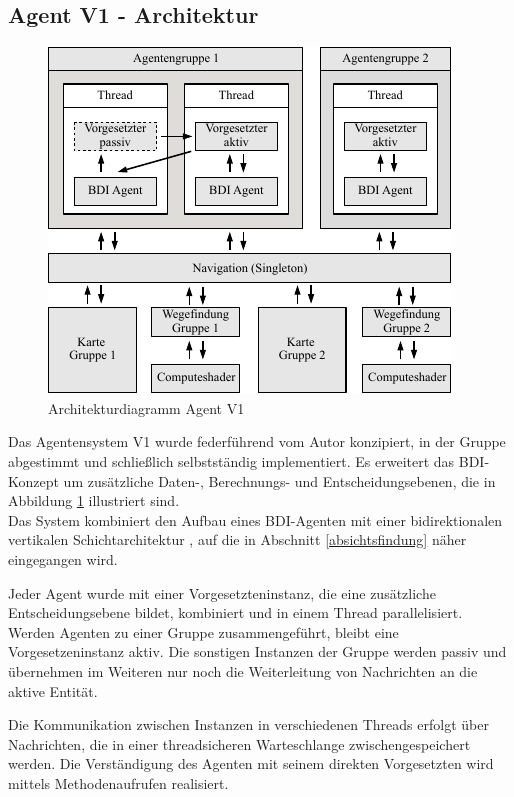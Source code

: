 \documentclass[runningheads]{llncs}
\begin{document}
\subsection{Agent V1 - Architektur}\label{agentV1}
\begin{figure}
\includegraphics{./Referenzen/Architekturdiagramm.pdf}
\caption{Architekturdiagramm Agent V1}
\label{g3:architecture}
\end{figure}
Das Agentensystem V1 wurde federführend vom Autor konzipiert, in der Gruppe abgestimmt und schließlich selbstständig implementiert. Es erweitert das BDI-Konzept \cite{Bratman1987} um zusätzliche Daten-, Berechnungs- und Entscheidungsebenen, die in Abbildung \ref{g3:architecture} illustriert sind. \\
Das System kombiniert den Aufbau eines BDI-Agenten mit einer bidirektionalen vertikalen Schichtarchitektur \cite[S. 61-62]{Weiss2000}, auf die in Abschnitt
\ref{absichtsfindung} näher eingegangen wird.

Jeder Agent wurde mit einer Vorgesetzteninstanz, die eine zusätzliche Entscheidungsebene bildet, kombiniert und in einem Thread parallelisiert. Werden Agenten zu einer Gruppe zusammengeführt, bleibt eine Vorgesetzeninstanz aktiv. Die sonstigen Instanzen der Gruppe werden passiv und übernehmen im Weiteren nur noch die Weiterleitung von Nachrichten an die aktive Entität.

Die Kommunikation zwischen Instanzen in verschiedenen Threads erfolgt über Nachrichten, die in einer threadsicheren Warteschlange zwischengespeichert werden. Die Verständigung des Agenten mit seinem direkten Vorgesetzten wird mittels Methodenaufrufen realisiert.
\end{document}
